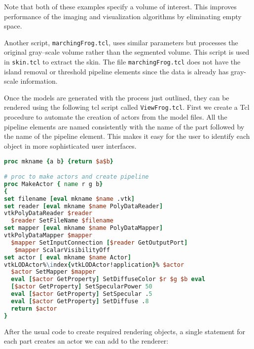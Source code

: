 Note that both of these examples specify a volume of interest. This improves performance of the imaging and visualization algorithms by eliminating empty space.

Another script, \texttt{marchingFrog.tcl}, uses similar parameters but processes the original gray--scale volume rather than the segmented volume. This script is used in \texttt{skin.tcl} to extract the skin. The file \texttt{marchingFrog.tcl} does not have the island removal or threshold pipeline elements since the data is already has gray-scale information.

Once the models are generated with the process just outlined, they can be rendered using the following tcl script called \texttt{ViewFrog.tcl}. First we create a Tcl procedure to automate the creation of actors from the model files. All the pipeline elements are named consistently with the name of the part followed by the name of the pipeline element. This makes it easy for the user to identify each object in more sophisticated user interfaces.

\begin{lstlisting}[language=TCL, caption={Automating the creation of actors.}, escapechar=\%]
proc mkname {a b} {return $a$b}

# proc to make actors and create pipeline
proc MakeActor { name r g b}
{
set filename [eval mkname $name .vtk]
set reader [eval mkname $name PolyDataReader]
vtkPolyDataReader $reader
  $reader SetFileName $filename
set mapper [eval mkname $name PolyDataMapper]
vtkPolyDataMapper $mapper
  $mapper SetInputConnection [$reader GetOutputPort]
   $mapper ScalarVisibilityOff
set actor [ eval mkname $name Actor]
vtkLODActor%\index{vtkLODActor!application}% $actor
  $actor SetMapper $mapper
  eval [$actor GetProperty] SetDiffuseColor $r $g $b eval
  [$actor GetProperty] SetSpecularPower 50
  eval [$actor GetProperty] SetSpecular .5
  eval [$actor GetProperty] SetDiffuse .8
  return $actor
}
\end{lstlisting}

After the usual code to create required rendering objects, a single statement for each part creates an actor we can add to the renderer:

